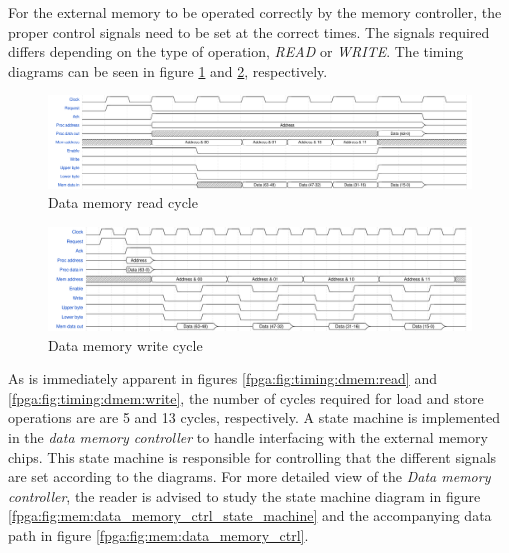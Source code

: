 For the external memory to be operated correctly by the memory controller, the proper control signals need to be set at the correct times. The signals required differs depending on the type of operation, \emph{READ} or \emph{WRITE}. The timing diagrams can be seen in figure \ref{fpga:fig:timing:dmem:read} and \ref{fpga:fig:timing:dmem:write}, respectively. 



\begin{figure}[H]
  \centering
  \includegraphics[width=\textwidth]{fpga/fig/timing/data_mem_read.pdf}
  \caption{Data memory read cycle}
  \label{fpga:fig:timing:dmem:read}
\end{figure}

\begin{figure}[H]
  \centering
  \includegraphics[width=\textwidth]{fpga/fig/timing/data_mem_write.pdf}
  \caption{Data memory write cycle}
  \label{fpga:fig:timing:dmem:write}
\end{figure}

As is immediately apparent in figures \vref{fpga:fig:timing:dmem:read} and \vref{fpga:fig:timing:dmem:write}, the number of cycles required for load and store operations are are 5 and 13 cycles, respectively.
A state machine is implemented in the \emph{data memory controller} to handle interfacing with the external memory chips.
This state machine is responsible for controlling that the different signals are set according to the diagrams.
For more detailed view of the \emph{Data memory controller}, the reader is advised to study the state machine diagram in figure \ref{fpga:fig:mem:data_memory_ctrl_state_machine} and the accompanying data path in figure \ref{fpga:fig:mem:data_memory_ctrl}.


